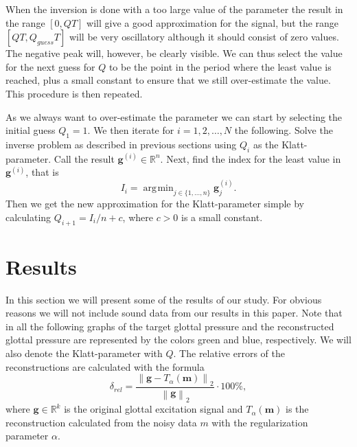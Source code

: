 \documentclass[12pt,a4]{article}
\DeclareMathOperator*{\argmin}{\arg\!\min}
\newcommand{\R}{{\mathbb R}}
\newcommand{\vc}[1]{\ensuremath{\bm{#1}}}
\begin{document}
When the inversion is done with a too large value of the parameter the result in the range $[0, QT]$ will give a good approximation for the signal, but the range $[QT, Q_{guess} T]$ will be very oscillatory although it should consist of zero values. The negative peak will, however, be clearly visible.  We can thus select the value for the next guess for $Q$ to be the point in the period where the least value is reached, plus a small constant to ensure that we still over-estimate the value. This procedure is then repeated.

As we always want to over-estimate the parameter we can start by selecting the initial guess $Q_1 = 1$. We then iterate for $i = 1, 2, \ldots, N$ the following. Solve the inverse problem as described in previous sections using $Q_i$ as the Klatt-parameter. Call the result $\vc{g}^{(i)} \in \R^n$. Next, find the index for the least value in $\vc{g}^{(i)}$, that is
\begin{equation*}
I_i = \argmin_{j \in \{1, \ldots, n\}} \vc{g}^{(i)}_j .
\end{equation*}
Then we get the new approximation for the Klatt-parameter simple by calculating $Q_{i+1} = I_i / n + c$, where $c > 0$ is a small constant.



\section{Results}
\label{sec:results}
In this section we will present some of the results of our study. For obvious reasons we will not include sound data from our results in this paper. Note that in all the following graphs of the target glottal pressure and the reconstructed glottal pressure are represented by the colors green and blue, respectively. We will also denote the Klatt-parameter with $Q$. The relative errors of the reconstructions are calculated with the formula
\begin{equation}
\delta_{rel} = \frac{\left\| \vc{g} - T_{\alpha}(\vc{m}) \right\|_2}{\left\| \vc{g} \right\|_2} \cdot 100 \%,
\end{equation}
where $\vc{g} \in \R^k$ is the original glottal excitation signal and $T_{\alpha}(\vc{m})$ is the reconstruction calculated from the noisy data $m$ with the regularization parameter $\alpha$.
\end{document}
